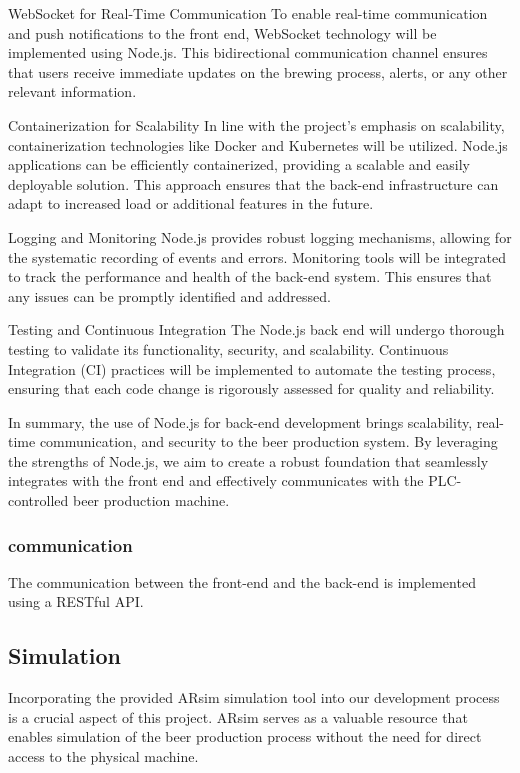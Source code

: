WebSocket for Real-Time Communication
To enable real-time communication and push notifications to the front end, WebSocket technology will be implemented using Node.js. This bidirectional communication channel ensures that users receive immediate updates on the brewing process, alerts, or any other relevant information.

Containerization for Scalability
In line with the project's emphasis on scalability, containerization technologies like Docker and Kubernetes will be utilized. Node.js applications can be efficiently containerized, providing a scalable and easily deployable solution. This approach ensures that the back-end infrastructure can adapt to increased load or additional features in the future.

Logging and Monitoring
Node.js provides robust logging mechanisms, allowing for the systematic recording of events and errors. Monitoring tools will be integrated to track the performance and health of the back-end system. This ensures that any issues can be promptly identified and addressed.

Testing and Continuous Integration
The Node.js back end will undergo thorough testing to validate its functionality, security, and scalability. Continuous Integration (CI) practices will be implemented to automate the testing process, ensuring that each code change is rigorously assessed for quality and reliability.

In summary, the use of Node.js for back-end development brings scalability, real-time communication, and security to the beer production system. By leveraging the strengths of Node.js, we aim to create a robust foundation that seamlessly integrates with the front end and effectively communicates with the PLC-controlled beer production machine.

\subsubsection{communication}
The communication between the front-end and the back-end is implemented using a RESTful API. 

\subsection{Simulation}
Incorporating the provided ARsim simulation tool into our development process is a crucial aspect of this project. 
ARsim serves as a valuable resource that enables simulation of the beer production process without the need for direct access to the physical machine. 

